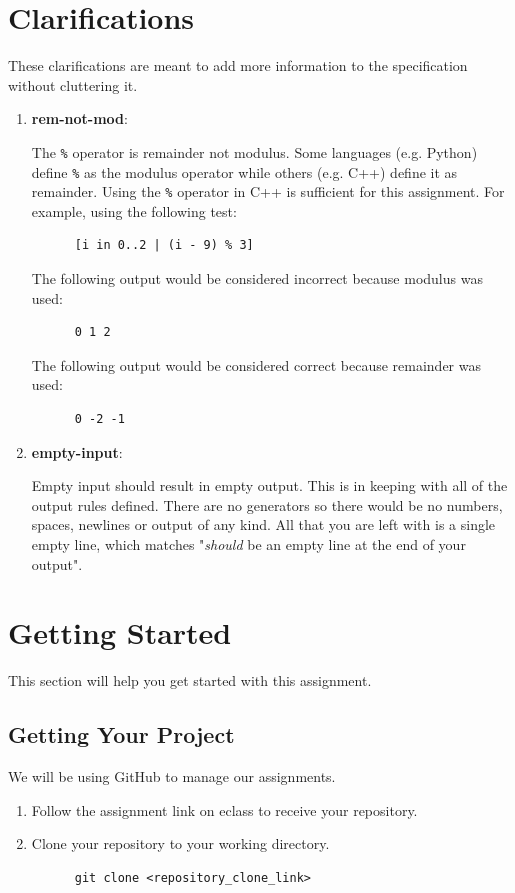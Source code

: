 \documentclass{article}
\newcommand{\code}[1]{\texttt{\textmd{#1}}}
\newcommand{\clarificationdest}[1]{\hypertarget{#1}{\textbf{#1}:}}
\begin{document}
\section{Clarifications}
These clarifications are meant to add more information to the specification without cluttering it.
\begin{enumerate}
  \item
    \clarificationdest{rem-not-mod}
    The \code{\%} operator is remainder not modulus. Some languages (e.g. Python) define \code{\%}
    as the modulus operator while others (e.g. C++) define it as remainder. Using the \code{\%}
    operator in C++ is sufficient for this assignment. For example, using the
    following test:
    \begin{lstlisting}
      [i in 0..2 | (i - 9) % 3]
    \end{lstlisting}
    The following output would be considered incorrect because modulus was used:
    \begin{lstlisting}
      0 1 2
    \end{lstlisting}
    The following output would be considered correct because remainder was used:
    \begin{lstlisting}
      0 -2 -1
    \end{lstlisting}
  \item
    \clarificationdest{empty-input}
    Empty input should result in empty output. This is in keeping with all of the output rules
    defined. There are no generators so there would be no numbers, spaces, newlines or output of
    any kind. All that you are left with is a single empty line, which matches "\textit{should} be
    an empty line at the end of your output".

\end{enumerate}

\section{Getting Started}
This section will help you get started with this assignment.

\subsection{Getting Your Project}
We will be using GitHub to manage our assignments.
\begin{enumerate}
  \item
    Follow the assignment link on eclass to receive your repository.
  \item
    Clone your repository to your working directory.
    \begin{lstlisting}
      git clone <repository_clone_link>
    \end{lstlisting}
\end{enumerate}
\end{document}
